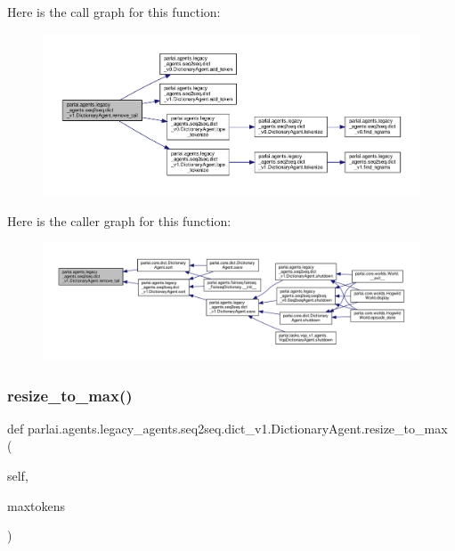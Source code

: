 Here is the call graph for this function\+:
\nopagebreak
\begin{figure}[H]
\begin{center}
\leavevmode
\includegraphics[width=350pt]{classparlai_1_1agents_1_1legacy__agents_1_1seq2seq_1_1dict__v1_1_1DictionaryAgent_a77b3d40dd63f7ab22bfc947b343339c7_cgraph}
\end{center}
\end{figure}
Here is the caller graph for this function\+:
\nopagebreak
\begin{figure}[H]
\begin{center}
\leavevmode
\includegraphics[width=350pt]{classparlai_1_1agents_1_1legacy__agents_1_1seq2seq_1_1dict__v1_1_1DictionaryAgent_a77b3d40dd63f7ab22bfc947b343339c7_icgraph}
\end{center}
\end{figure}
\mbox{\label{classparlai_1_1agents_1_1legacy__agents_1_1seq2seq_1_1dict__v1_1_1DictionaryAgent_a11701fcf8e4fb57e78fa6a2f4cc29800}} 
\subsubsection{\texorpdfstring{resize\+\_\+to\+\_\+max()}{resize\_to\_max()}}
{\footnotesize\ttfamily def parlai.\+agents.\+legacy\+\_\+agents.\+seq2seq.\+dict\+\_\+v1.\+Dictionary\+Agent.\+resize\+\_\+to\+\_\+max (\begin{DoxyParamCaption}\item[{}]{self,  }\item[{}]{maxtokens }\end{DoxyParamCaption})}

